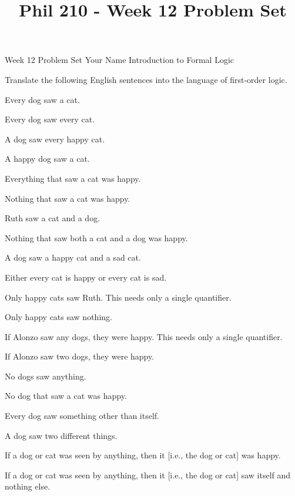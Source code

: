 
\title{Phil 210 - Week 12 Problem Set}

\heading
Week 12 Problem Set
Your Name
Introduction to Formal Logic
\endheading

Translate the following English sentences into the language of first-order logic.

\quantifiers
\problems
{}
Every dog saw a cat.
        \answer
        $ $
        \endanswer

Every dog saw every cat.
        \answer
        $ $
        \endanswer

A dog saw every happy cat.
        \answer
        $ $
        \endanswer

A happy dog saw a cat.
        \answer
        $ $
        \endanswer

Everything that saw a cat was happy.
        \answer
        $ $
        \endanswer

Nothing that saw a cat was happy.
        \answer
        $ $
        \endanswer

Ruth saw a cat and a dog.
        \answer
        $ $
        \endanswer

Nothing that saw both a cat and a dog was happy.
        \answer
        $ $
        \endanswer

A dog saw a happy cat and a sad cat.
        \answer
        $ $
        \endanswer

Either every cat is happy or every cat is sad.
        \answer
        $ $
        \endanswer

Only happy cats saw Ruth.
\Hint This needs only a single quantifier.
        \answer
        $ $
        \endanswer

Only happy cats saw nothing.
        \answer
        $ $
        \endanswer

If Alonzo saw any dogs, they were happy.
\Hint This needs only a single quantifier.
        \answer
        $ $
        \endanswer

If Alonzo saw two dogs, they were happy.
        \answer
        $ $
        \endanswer

No dogs saw anything.
        \answer
        $ $
        \endanswer

No dog that saw a cat was happy.
        \answer
        $ $
        \endanswer

Every dog saw something other than itself.
        \answer
        $ $
        \endanswer

A dog saw two different things.
        \answer
        $ $
        \endanswer

If a dog or cat was seen by anything, then it [i.e., the dog or cat] was happy.
        \answer
        $ $
        \endanswer

If a dog or cat was seen by anything, then it [i.e., the dog or cat] saw itself and nothing else.
        \answer
        $ $
        \endanswer

\endproblems
\bye
